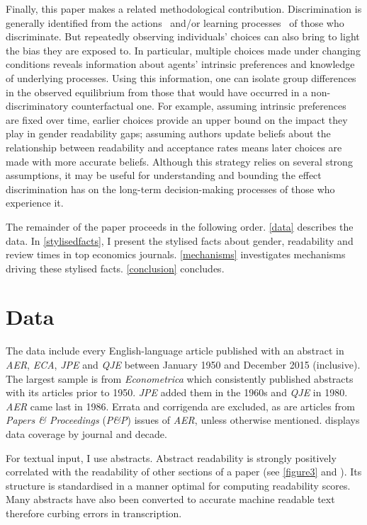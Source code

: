 Finally, this paper makes a related methodological contribution. Discrimination is generally identified from the actions~\citep[\emph{e.g.},][]{Neumark1996,Bertrand2004} and\slash or learning processes~\citep[\emph{e.g.},][]{Altonji2001,Fryer2013} of those who discriminate. But repeatedly observing individuals' choices can also bring to light the bias they are exposed to. In particular, multiple choices made under changing conditions reveals information about agents' intrinsic preferences and knowledge of underlying processes. Using this information, one can isolate group differences in the observed equilibrium from those that would have occurred in a non-discriminatory counterfactual one. For example, assuming intrinsic preferences are fixed over time, earlier choices provide an upper bound on the impact they play in gender readability gaps; assuming authors update beliefs about the relationship between readability and acceptance rates means later choices are made with more accurate beliefs. Although this strategy relies on several strong assumptions, it may be useful for understanding and bounding the effect discrimination has on the long-term decision-making processes of those who experience it.

The remainder of the paper proceeds in the following order. \autoref{data} describes the data. In \autoref{stylisedfacts}, I present the stylised facts about gender, readability and review times in top economics journals. \autoref{mechanisms} investigates mechanisms driving these stylised facts. \autoref{conclusion} concludes.

\section{Data}
\label{data}

The data include every English-language article published with an abstract in \emph{AER}, \emph{ECA}, \emph{JPE} and \emph{QJE} between January 1950 and December 2015 (inclusive). The largest sample is from \emph{Econometrica} which consistently published abstracts with its articles prior to 1950. \emph{JPE} added them in the 1960s and \emph{QJE} in 1980. \emph{AER} came last in 1986. Errata and corrigenda are excluded, as are articles from \emph{Papers \& Proceedings} (\emph{P\&P}) issues of \emph{AER}, unless otherwise mentioned.  displays data coverage by journal and decade.

For textual input, I use abstracts. Abstract readability is strongly positively correlated with the readability of other sections of a paper (see \autoref{figure3} and  \citet{Hartley2003b,Plaven-Sigray2017}). Its structure is standardised in a manner optimal for computing readability scores. Many abstracts have also been converted to accurate machine readable text therefore curbing errors in transcription.

